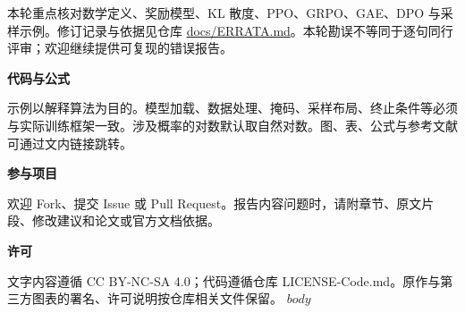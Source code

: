 \documentclass[UTF8,a4paper,11pt,openany,oneside,fontset=fandol]{ctexbook}
\begin{document}
本轮重点核对数学定义、奖励模型、KL 散度、PPO、GRPO、GAE、DPO 与采样示例。修订记录与依据见仓库 \href{https://github.com/jweihe/RLHF-book-Chinese/blob/main/docs/ERRATA.md}{docs/ERRATA.md}。本轮勘误不等同于逐句同行评审；欢迎继续提供可复现的错误报告。

\medskip
\noindent\textbf{代码与公式}\par
示例以解释算法为目的。模型加载、数据处理、掩码、采样布局、终止条件等必须与实际训练框架一致。涉及概率的对数默认取自然对数。图、表、公式与参考文献可通过文内链接跳转。

\medskip
\noindent\textbf{参与项目}\par
欢迎 Fork、提交 Issue 或 Pull Request。报告内容问题时，请附章节、原文片段、修改建议和论文或官方文档依据。

\medskip
\noindent\textbf{许可}\par
文字内容遵循 CC BY-NC-SA 4.0；代码遵循仓库 LICENSE-Code.md。原作与第三方图表的署名、许可说明按仓库相关文件保留。
\clearpage
\tableofcontents
\mainmatter
$body$
\end{document}
